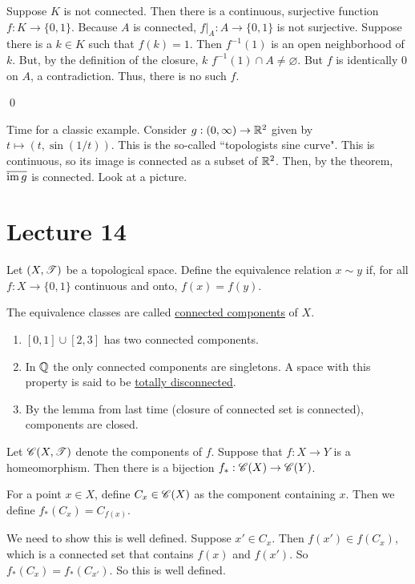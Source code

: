 \documentclass[x11names,reqno,14pt]{extarticle}
\newcommand*{\oo}{{\infty}}
\begin{document}
\proof

Suppose $K$ is not connected. Then there is a continuous, surjective function $f:K\to\{0, 1\}$. Because $A$ is connected, $f|_A:A\to\{0, 1\}$ is not surjective. Suppose there is a $k \in K$ such that $f(k) = 1$. Then $f^{-1}(1)$ is an open neighborhood of $k$. But, by the definition of the closure, $k$ $f^{-1}(1) \cap A \neq\varnothing$. But $f$ is identically $0$ on $A$, a contradiction. Thus, there is no such $f$. 

\qed

\exm

Time for a classic example. Consider $g:(0, \oo)\to\R^2$ given by $t \mapsto (t, \sin(1/t))$. This is the so-called ``topologists sine curve". This is continuous, so its image is connected as a subset of $\mathbb{R}^2$. Then, by the theorem, $\overline{\operatorname{\mathrm{im}} g}$ is connected. Look at a picture. 

\section*{Lecture 14}


Let $(X, \mathscr{T})$ be a topological space. Define the equivalence relation $x \sim y$ if, for all $f:X\to\{0, 1\}$ continuous and onto, $f(x) = f(y)$. 

The equivalence classes are called \underline{connected components} of $X$. 

\exm

\begin{enumerate}
\item $[0, 1] \cup [2, 3]$ has two connected components. 
\item In $\mathbb{Q}$ the only connected components are singletons. A space with this property is said to be \underline{totally disconnected}.
\item By the lemma from last time (closure of connected set is connected), components are closed. 
\end{enumerate}

\prop

Let $\mathscr{C}(X, \mathscr{T})$ denote the components of $f$. Suppose that $f:X\to Y$ is a homeomorphism. Then there is a bijection $f_*:\mathscr{C}(X)\to\mathscr{C}(Y)$. 

\proof

For a point $x \in X$, define $C_x\in\mathscr{C}(X)$ as the component containing $x$. Then we define $f_*(C_x) = C_{f(x)}$. 

We need to show this is well defined. Suppose $x' \in C_x$. Then $f(x') \in f(C_x)$, which is a connected set that contains $f(x)$ and $f(x')$. So $f_*(C_x) = f_*(C_{x'})$. So this is well defined. 
\end{document}
